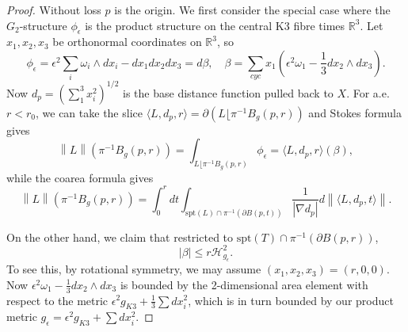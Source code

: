 \documentclass{article}
\theoremstyle{definition}
\newcommand{\R}{\mathbb{R}}
\newcommand{\norm}[1]{\left\lVert#1\right\rVert}
\begin{document}
				
				
				
				
				
				\begin{proof}
				Without loss $p$ is the origin. We first consider the special case where the $G_2$-structure $\phi_\epsilon$ is the product structure on the central K3 fibre times $\R^3$. Let $x_1,x_2,x_3$ be orthonormal coordinates on $\R^3$, so 
				\[
				\phi_\epsilon= \epsilon^2\sum_i \omega_i \wedge dx_i - dx_1dx_2dx_3=  d\beta, \quad \beta=\sum_{cyc}  x_1( \epsilon^2\omega_1- \frac{1}{3} dx_2\wedge dx_3 ). 
				\]
				Now $d_p= (\sum_1^3 x_i^2)^{1/2}$ is the base distance function pulled back to $X$. 	For a.e. $r<r_0$, we can take the slice 
			$
				\langle L, d_p, r\rangle=  \partial (L\lfloor  \pi^{-1}B_g(p, r))
			$
				and Stokes formula gives	\[
				\norm{L}(  \pi^{-1}B_g(p, r)  )= \int_{L\lfloor \pi^{-1}B_g(p, r) } \phi_\epsilon= \langle L, d_p, r\rangle (   \beta     ),
				\]
				while the coarea formula gives
				\[
				\norm{L}(  \pi^{-1}B_g(p, r)  )=  \int_0^r dt \int_{  \text{spt}(L) \cap \pi^{-1}(\partial B(p,t))  } \frac{1}{|\nabla d_p| } d\norm{ \langle L, d_p, t \rangle}.
				\]
				
				
				On the other hand,  we claim that restricted to  $\text{spt}(T) \cap \pi^{-1}(\partial B(p,r))$,
				\begin{equation}\label{eqn:primitive1}
				  |\beta |  \leq r \mathcal{H}^2_{g_\epsilon}.
				\end{equation}
				To see this, by rotational symmetry, we may assume $(x_1, x_2, x_3)=(r,0,0)$. Now 
			$
			\epsilon^2	\omega_1- \frac{1}{3} dx_2\wedge dx_3 
			$
			is bounded by the 2-dimensional area element with respect to the metric $\epsilon^2 g_{K3}+ \frac{1}{3}  \sum dx_i^2 $, which is in turn bounded by our product metric $g_\epsilon= \epsilon^2 g_{K3}+ \sum dx_i^2$. 
			
			
			

\end{proof}
\end{document}
